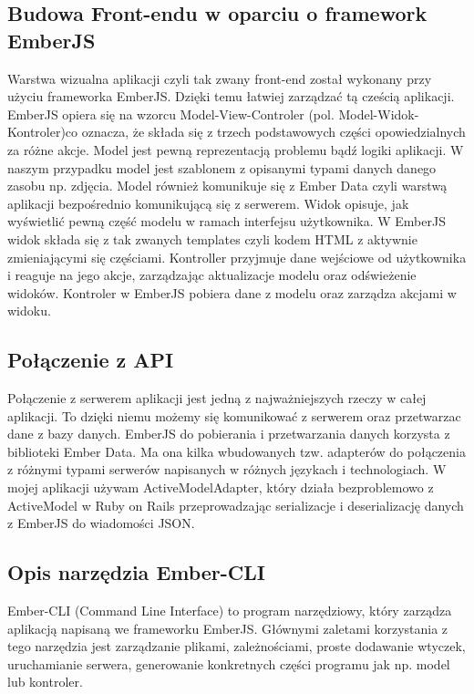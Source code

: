 \documentclass[brudnopis]{xmgr}
\begin{document}
\subsection{Budowa Front-endu w oparciu o framework EmberJS }
Warstwa wizualna aplikacji czyli tak zwany front-end został wykonany przy użyciu frameworka EmberJS. Dzięki temu łatwiej zarządzać tą cześcią aplikacji. EmberJS opiera się na wzorcu Model-View-Controler (pol. Model-Widok-Kontroler)co oznacza, że składa się z
trzech podstawowych części opowiedzialnych za różne akcje. Model  jest pewną reprezentacją problemu bądź logiki aplikacji. W naszym przypadku model jest szablonem z opisanymi typami danych danego zasobu np. zdjęcia. Model również komunikuje się z Ember Data czyli warstwą aplikacji bezpośrednio komunikującą się z serwerem.  Widok opisuje, jak wyświetlić pewną część modelu w ramach interfejsu użytkownika. W EmberJS widok składa się z tak zwanych templates czyli kodem HTML z aktywnie zmieniającymi się częściami. Kontroller przyjmuje dane wejściowe od użytkownika i reaguje na jego akcje, zarządzając aktualizacje modelu oraz odświeżenie widoków. Kontroler w EmberJS pobiera dane z modelu oraz zarządza akcjami w widoku.

\subsection{Połączenie z API}
Połączenie z serwerem aplikacji jest jedną z najważniejszych rzeczy w całej aplikacji. To dzięki niemu możemy się komunikować z serwerem oraz przetwarzac dane z bazy danych. EmberJS do pobierania i przetwarzania danych korzysta z biblioteki Ember Data. Ma ona kilka wbudowanych tzw. adapterów do połączenia z różnymi typami serwerów napisanych w różnych językach i technologiach. W mojej aplikacji używam ActiveModelAdapter, który działa bezproblemowo z ActiveModel w Ruby on Rails przeprowadzając serializacje i deserializację danych z EmberJS do wiadomości JSON.

\subsection{Opis narzędzia Ember-CLI}
Ember-CLI (Command Line Interface) to program narzędziowy, który zarządza aplikacją napisaną we frameworku EmberJS. Głównymi zaletami korzystania z tego narzędzia jest zarządzanie plikami, zależnościami, proste dodawanie wtyczek, uruchamianie serwera, generowanie konkretnych części programu jak np. model lub kontroler.
\end{document}
